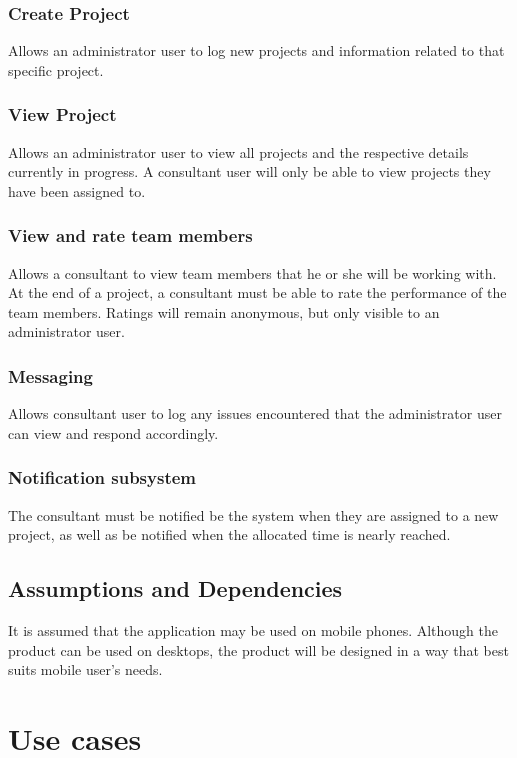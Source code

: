 \documentclass[a4paper, 12pt, oneside]{article}
\begin{document}
\subsubsection{Create Project}
Allows an administrator user to log new projects and information related to that specific project.

\subsubsection{View Project}
Allows an administrator user to view all projects and the respective details currently in progress. A consultant user will only be able to view projects they have been assigned to.

\subsubsection{View and rate team members}
Allows a  consultant to view team members that he or she will be working with. At the end of a project, a consultant must be able to rate the performance of the team members. Ratings will remain anonymous, but only visible to an administrator user.

\subsubsection{Messaging}
Allows consultant user to log any issues encountered that the administrator user can view and respond accordingly.

\subsubsection{Notification subsystem}
The consultant must be notified be the system when they are assigned to a new project, as well as be notified when the allocated time is nearly reached.

\subsection{Assumptions and Dependencies}
It is assumed that the application may be used on mobile phones. Although the product can be used on desktops, the product will be designed in a way that best suits mobile user’s needs.

\newpage
\section{Use cases}
\end{document}
